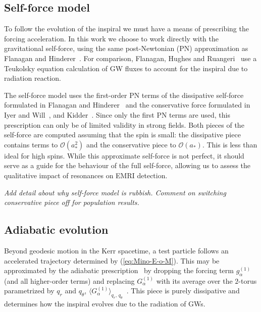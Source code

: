 \documentclass[aps,prd,amsfonts,amssymb,amsmath,nofootinbib,showpacs,superscriptaddress,twocolumn]{revtex4}
\newcommand{\eqnref}[1]{(\ref{eq:#1})}
\newcommand{\order}[1]{\ensuremath{\mathcal{O}({#1})}}
\begin{document}
\subsection{Self-force model}
\label{sec:self-force}

To follow the evolution of the inspiral we must have a means of prescribing the forcing acceleration. In this work we choose to work directly with the gravitational self-force, using the same post-Newtonian (PN) approximation as Flanagan and Hinderer~\cite{Flanagan2012}. For comparison, Flanagan, Hughes and Ruangeri~\cite{Flanagan2012a} use a Teukolsky equation calculation of GW fluxes to account for the inspiral due to radiation reaction.

The self-force model uses the first-order PN terms of the dissipative self-force formulated in Flanagan and Hinderer~\cite{Flanagan2007} and the conservative force formulated in Iyer and Will~\cite{Iyer1993}, and Kidder~\cite{Kidder1995}. Since only the first PN terms are used, this prescription can only be of limited validity in strong fields. Both pieces of the self-force are computed assuming that the spin is small: the dissipative piece contains terms to $\order{a_\ast^2}$ and the conservative piece to $\order{a_\ast}$. This is less than ideal for high spins. While this approximate self-force is not perfect, it should serve as a guide for the behaviour of the full self-force, allowing us to assess the qualitative impact of resonances on EMRI detection.

\emph{Add detail about why self-force model is rubbish. Comment on switching conservative piece off for population results.}

\subsection{Adiabatic evolution}
\label{sec:adiabatic}

Beyond geodesic motion in the Kerr spacetime, a test particle follows an accelerated trajectory determined by \eqnref{Mino-E-o-M}. This may be approximated by the adiabatic prescription~\cite{Hinderer2008} by dropping the forcing term $g_\alpha^{(1)}$ (and all higher-order terms) and replacing $G_\alpha^{(1)}$ with its average over the $2$-torus parametrized by $q_r$ and $q_\theta$, $\langle G_\alpha^{(1)}\rangle_{q_r,\,q_\theta}$~\cite{Drasco2005}. This piece is purely dissipative and determines how the inspiral evolves due to the radiation of GWs.
\end{document}
